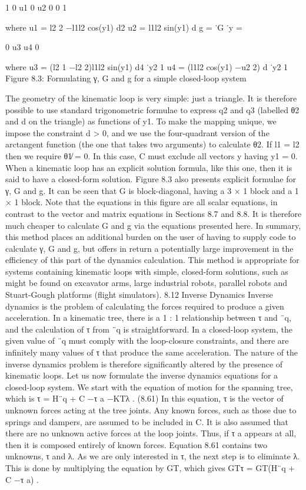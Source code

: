 1 0 u1 0 u2 0 0 1

where u1 = l2 2 −l1l2 cos(y1) d2 u2 = l1l2 sin(y1) d g = ˙G ˙y =

0 u3 u4 0

where u3 = (l2 1 −l2 2)l1l2 sin(y1) d4 ˙y2 1 u4 = (l1l2 cos(y1) −u2 2) d ˙y2 1 Figure 8.3: Formulating γ, G and g for a simple closed-loop system

The geometry of the kinematic loop is very simple: just a triangle. It is therefore possible to use standard trigonometric formulae to express q2 and q3 (labelled θ2 and d on the triangle) as functions of y1. To make the mapping unique, we impose the constraint d > 0, and we use the four-quadrant version of the arctangent function (the one that takes two arguments) to calculate θ2. If l1 = l2 then we require θ1̸ = 0. In this case, C must exclude all vectors y having y1 = 0. When a kinematic loop has an explicit solution formula, like this one, then it is said to have a closed-form solution. Figure 8.3 also presents explicit formulae for γ, G and g. It can be seen that G is block-diagonal, having a 3 × 1 block and a 1 × 1 block. Note that the equations in this figure are all scalar equations, in contrast to the vector and matrix equations in Sections 8.7 and 8.8. It is therefore much cheaper to calculate G and g via the equations presented here. In summary, this method places an additional burden on the user of having to supply code to calculate γ, G and g, but offers in return a potentially large improvement in the efficiency of this part of the dynamics calculation. This method is appropriate for systems containing kinematic loops with simple, closed-form solutions, such as might be found on excavator arms, large industrial robots, parallel robots and Stuart-Gough platforms (flight simulators). 8.12 Inverse Dynamics Inverse dynamics is the problem of calculating the forces required to produce a given acceleration. In a kinematic tree, there is a 1 : 1 relationship between τ and ¨q, and the calculation of τ from ¨q is straightforward. In a closed-loop system, the given value of ¨q must comply with the loop-closure constraints, and there are infinitely many values of τ that produce the same acceleration. The nature of the inverse dynamics problem is therefore significantly altered by the presence of kinematic loops. Let us now formulate the inverse dynamics equations for a closed-loop system. We start with the equation of motion for the spanning tree, which is τ = H¨q + C −τ a −KTλ . (8.61) In this equation, τ is the vector of unknown forces acting at the tree joints. Any known forces, such as those due to springs and dampers, are assumed to be included in C. It is also assumed that there are no unknown active forces at the loop joints. Thus, if τ a appears at all, then it is composed entirely of known forces. Equation 8.61 contains two unknowns, τ and λ. As we are only interested in τ, the next step is to eliminate λ. This is done by multiplying the equation by GT, which gives GTτ = GT(H¨q + C −τ a) .

